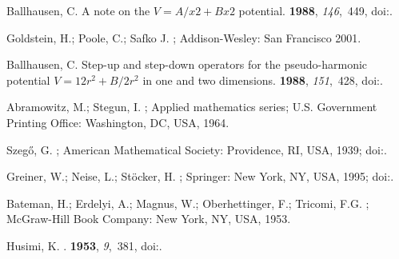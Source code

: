 \documentclass[preprints,article,accept,moreauthors,pdftex]{Definitions/mdpi}
\begin{document}
\begin{thebibliography}{999}
Ballhausen, C.
\newblock A note on the $V=A/x2+Bx2$ potential.
 {\bf 1988}, {\em 146},~449,
\newblock
  doi:{\href{https://doi.org/10.1016/0009-2614(88)87476-1}{}}.

Goldstein, H.; Poole, C.; Safko J.
; Addison-Wesley: San Francisco %
  2001.

Ballhausen, C.
\newblock Step-up and step-down operators for the pseudo-harmonic potential
  $V=12r^2+B/2r^2$ in one and two dimensions.
 {\bf 1988}, {\em 151},~428,
\newblock
  doi:{\href{https://doi.org/10.1016/0009-2614(88)85162-5}{}}.

Abramowitz, M.; Stegun, I.
; Applied mathematics series; U.S. Government Printing
  Office: Washington, DC, USA,  1964.

Szeg{\H{o}}, G.
; American Mathematical Society: Providence, RI, USA, 1939;
\newblock
  doi:{\href{https://doi.org/10.1090/coll/023}{}}.

Greiner, W.; Neise, L.; St\"{o}cker, H.
; Springer: New York, NY, USA,
  1995;
\newblock
  doi:{\href{https://doi.org/10.1007/978-1-4612-0827-3}{}}.

Bateman, H.; Erdelyi, A.; Magnus, W.; Oberhettinger, F.; Tricomi, F.G.
; McGraw-Hill Book
  Company:  New York, NY, USA, 1953.

Husimi, K.
.
 {\bf 1953}, {\em 9},~381,
\newblock
  doi:{\href{https://doi.org/10.1143/ptp/9.4.381}{}}.


\end{thebibliography}
\end{document}
